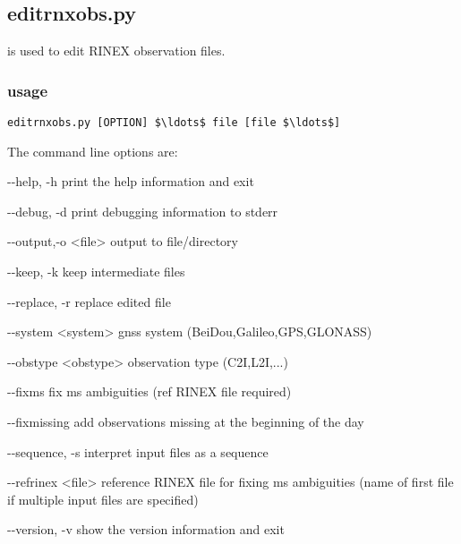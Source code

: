 \subsection{editrnxobs.py}

\hypertarget{h:editrnxobs}{}

 is used to edit RINEX observation files. 

\subsubsection{usage}

\begin{lstlisting}[mathescape=true]
editrnxobs.py [OPTION] $\ldots$ file [file $\ldots$] 
\end{lstlisting}
The command line options are:
\begin{description*}
	\item[-{}-help, -h]            print the help information and exit
  \item[-{}-debug, -d]           print debugging information to stderr
  \item[-{}-output,-o \textless{file}\textgreater]  output to file/directory
  \item[-{}-keep, -k]            keep intermediate files
  \item[-{}-replace, -r]         replace edited file
  \item[-{}-system \textless{system}\textgreater ]      gnss system (BeiDou,Galileo,GPS,GLONASS)
  \item[-{}-obstype \textless{obstype}\textgreater]     observation type (C2I,L2I,...)
  \item[-{}-fixms ]              fix ms ambiguities (ref RINEX file required)
  \item[-{}-fixmissing ]         add observations missing at the beginning of the day
  \item[-{}-sequence, -s ]       interpret input files as a sequence
  \item[-{}-refrinex \textless{file}\textgreater ]  reference RINEX file for fixing ms ambiguities (name of first file if multiple input files are specified)
  \item[-{}-version, -v ]        show the version information and exit
\end{description*}

